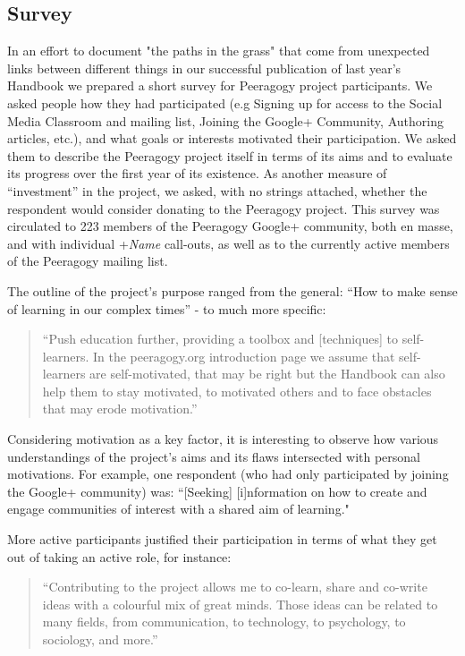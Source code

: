 \documentclass{acm_proc_article-sp}
\begin{document}
\subsection{Survey} \label{survey}

In an effort to document "the paths in the grass" \cite{Wall} that come from unexpected links between different things in our successful publication of last year's Handbook we prepared a short survey for Peeragogy project participants. We asked people how they had participated (e.g Signing up for access to the Social Media Classroom and mailing list, Joining the Google+ Community, Authoring articles, etc.), and what goals or interests motivated their participation. We asked them to describe the Peeragogy project itself in terms of its aims and to evaluate its progress over the first year of its existence. As another measure of ``investment'' in the project, we asked, with no strings attached, whether the respondent would consider donating to the Peeragogy project. This survey was circulated to 223 members of the Peeragogy Google+ community, both en masse, and with individual +{\sl Name} call-outs, as well as to the currently active members of the Peeragogy mailing list.

The outline of the project's purpose ranged from the general: ``How to
make sense of learning in our complex times'' - to much more
specific:

\begin{quote}
``Push education further, providing a toolbox and [techniques] to
self-learners. In the peeragogy.org introduction page we assume that
self-learners are self-motivated, that may be right but the Handbook
can also help them to stay motivated, to motivated others and to face obstacles that may erode motivation.''
\end{quote}

Considering motivation as a key factor, it is interesting to observe
how various understandings of the project's aims and its flaws
intersected with personal motivations. For example, one respondent
(who had only participated by joining the Google+ community) was:
``[Seeking] [i]nformation on how to create and engage communities of
interest with a shared aim of learning."

More active participants justified their participation in terms of what they get out of taking an active role, for instance:

\begin{quote}
``Contributing to the project allows me to co-learn, share and co-write ideas with a colourful mix of great minds. Those ideas can be related to many fields, from communication, to technology, to psychology, to sociology, and more.''
\end{quote}
\end{document}
